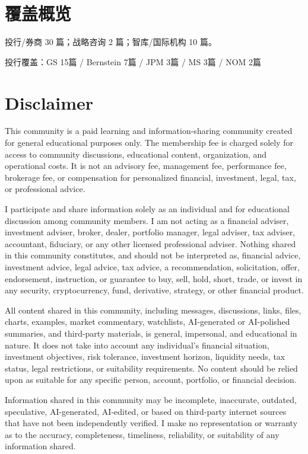 \documentclass[11pt]{ctexart}
\begin{document}
\section{覆盖概览}
投行/券商 30 篇；战略咨询 2 篇；智库/国际机构 10 篇。\par
投行覆盖：GS 15篇 / Bernstein 7篇 / JPM 3篇 / MS 3篇 / NOM 2篇\par
\section{Disclaimer}
{\scriptsize\color{refgray}
This community is a paid learning and information-sharing community created for general educational purposes only. The membership fee is charged solely for access to community discussions, educational content, organization, and operational costs. It is not an advisory fee, management fee, performance fee, brokerage fee, or compensation for personalized financial, investment, legal, tax, or professional advice.\par
I participate and share information solely as an individual and for educational discussion among community members. I am not acting as a financial adviser, investment adviser, broker, dealer, portfolio manager, legal adviser, tax adviser, accountant, fiduciary, or any other licensed professional adviser. Nothing shared in this community constitutes, and should not be interpreted as, financial advice, investment advice, legal advice, tax advice, a recommendation, solicitation, offer, endorsement, instruction, or guarantee to buy, sell, hold, short, trade, or invest in any security, cryptocurrency, fund, derivative, strategy, or other financial product.\par
All content shared in this community, including messages, discussions, links, files, charts, examples, market commentary, watchlists, AI-generated or AI-polished summaries, and third-party materials, is general, impersonal, and educational in nature. It does not take into account any individual's financial situation, investment objectives, risk tolerance, investment horizon, liquidity needs, tax status, legal restrictions, or suitability requirements. No content should be relied upon as suitable for any specific person, account, portfolio, or financial decision.\par
Information shared in this community may be incomplete, inaccurate, outdated, speculative, AI-generated, AI-edited, or based on third-party internet sources that have not been independently verified. I make no representation or warranty as to the accuracy, completeness, timeliness, reliability, or suitability of any information shared.\par
}
\end{document}

